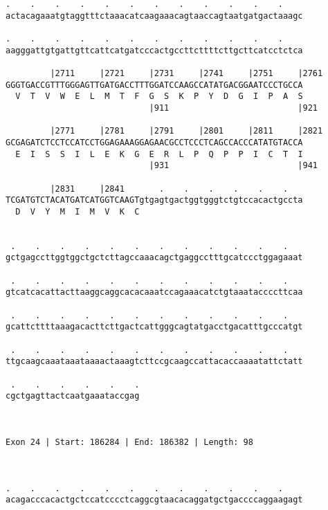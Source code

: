 \documentclass{article}
\begin{document}
\begin{Verbatim}
.    .    .    .    .    .    .    .    .    .    .    .    
actacagaaatgtaggtttctaaacatcaagaaacagtaaccagtaatgatgactaaagc
                                                            
.    .    .    .    .    .    .    .    .    .    .    .    
aagggattgtgattgttcattcatgatcccactgccttcttttcttgcttcatcctctca
                                                            
         |2711     |2721     |2731     |2741     |2751     |2761
GGGTGACCGTTTGGGAGTTGATGACCTTTGGATCCAAGCCATATGACGGAATCCCTGCCA
  V  T  V  W  E  L  M  T  F  G  S  K  P  Y  D  G  I  P  A  S
                             |911                          |921
  
         |2771     |2781     |2791     |2801     |2811     |2821
GCGAGATCTCCTCCATCCTGGAGAAAGGAGAACGCCTCCCTCAGCCACCCATATGTACCA
  E  I  S  S  I  L  E  K  G  E  R  L  P  Q  P  P  I  C  T  I
                             |931                          |941
  
         |2831     |2841       .    .    .    .    .    .   
TCGATGTCTACATGATCATGGTCAAGTgtgagtgactggtgggtctgtccacactgccta
  D  V  Y  M  I  M  V  K  C                                 
                                                            
  
 .    .    .    .    .    .    .    .    .    .    .    .   
gctgagccttggtggctgctcttagccaaacagctgaggcctttgcatccctggagaaat
                                                            
 .    .    .    .    .    .    .    .    .    .    .    .   
gtcatcacattacttaaggcaggcacacaaatccagaaacatctgtaaataccccttcaa
                                                            
 .    .    .    .    .    .    .    .    .    .    .    .   
gcattcttttaaagacacttcttgactcattgggcagtatgacctgacatttgcccatgt
                                                            
 .    .    .    .    .    .    .    .    .    .    .    .   
ttgcaagcaaataaataaaactaaagtcttccgcaagccattacaccaaaatattctatt
                                                            
 .    .    .    .    .    .
cgctgagttactcaatgaaataccgag
                           
                           
 
Exon 24 | Start: 186284 | End: 186382 | Length: 98



.    .    .    .    .    .    .    .    .    .    .    .    
acagacccacactgctccatcccctcaggcgtaacacaggatgctgaccccaggaagagt
                                                            

\end{Verbatim}
\end{document}
